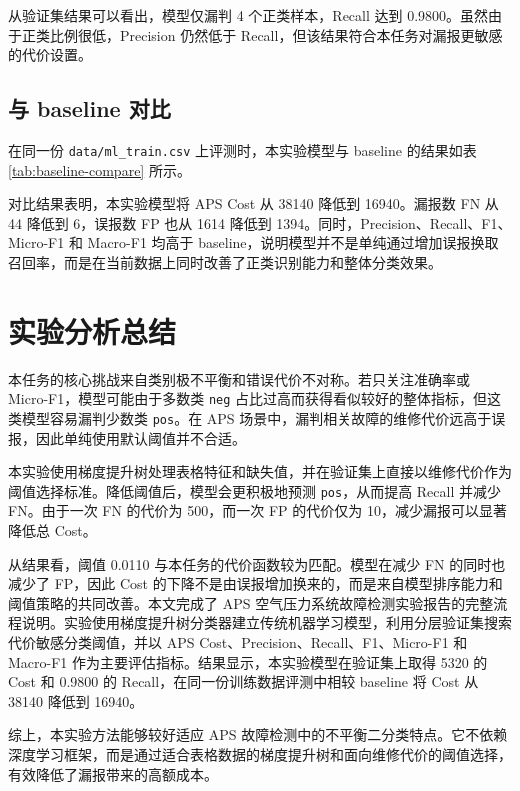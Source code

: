 \documentclass[UTF8,a4paper,10pt]{ctexart}
\begin{document}
从验证集结果可以看出，模型仅漏判 4 个正类样本，Recall 达到 0.9800。虽然由于正类比例很低，Precision 仍然低于 Recall，但该结果符合本任务对漏报更敏感的代价设置。

\subsection{与 baseline 对比}
在同一份 \texttt{data/ml\_train.csv} 上评测时，本实验模型与 baseline 的结果如表 \ref{tab:baseline-compare} 所示。

\begin{table}[H]
  \centering
  \scriptsize
  \caption{本实验模型与 baseline 的评测结果对比}
  \label{tab:baseline-compare}
\end{table}

对比结果表明，本实验模型将 APS Cost 从 38140 降低到 16940。漏报数 FN 从 44 降低到 6，误报数 FP 也从 1614 降低到 1394。同时，Precision、Recall、F1、Micro-F1 和 Macro-F1 均高于 baseline，说明模型并不是单纯通过增加误报换取召回率，而是在当前数据上同时改善了正类识别能力和整体分类效果。

\section{实验分析总结}

本任务的核心挑战来自类别极不平衡和错误代价不对称。若只关注准确率或 Micro-F1，模型可能由于多数类 \texttt{neg} 占比过高而获得看似较好的整体指标，但这类模型容易漏判少数类 \texttt{pos}。在 APS 场景中，漏判相关故障的维修代价远高于误报，因此单纯使用默认阈值并不合适。

本实验使用梯度提升树处理表格特征和缺失值，并在验证集上直接以维修代价作为阈值选择标准。降低阈值后，模型会更积极地预测 \texttt{pos}，从而提高 Recall 并减少 FN。由于一次 FN 的代价为 500，而一次 FP 的代价仅为 10，减少漏报可以显著降低总 Cost。

从结果看，阈值 0.0110 与本任务的代价函数较为匹配。模型在减少 FN 的同时也减少了 FP，因此 Cost 的下降不是由误报增加换来的，而是来自模型排序能力和阈值策略的共同改善。本文完成了 APS 空气压力系统故障检测实验报告的完整流程说明。实验使用梯度提升树分类器建立传统机器学习模型，利用分层验证集搜索代价敏感分类阈值，并以 APS Cost、Precision、Recall、F1、Micro-F1 和 Macro-F1 作为主要评估指标。结果显示，本实验模型在验证集上取得 5320 的 Cost 和 0.9800 的 Recall，在同一份训练数据评测中相较 baseline 将 Cost 从 38140 降低到 16940。

综上，本实验方法能够较好适应 APS 故障检测中的不平衡二分类特点。它不依赖深度学习框架，而是通过适合表格数据的梯度提升树和面向维修代价的阈值选择，有效降低了漏报带来的高额成本。

\newpage


\end{document}

